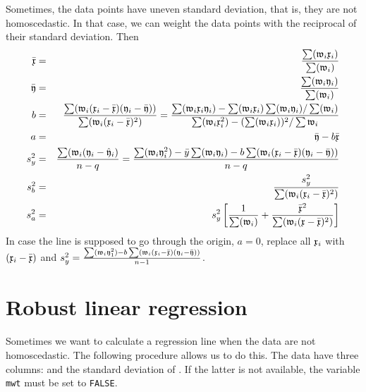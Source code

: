 \begin{refsection}
Sometimes, the data points have uneven standard deviation, that is, they are not homoscedastic. In that case, we can weight the data points with the reciprocal of their standard deviation. Then
\begin{eqnarray}
  \nonumber
  \bar{\mathfrak{x}} &=& \frac{\sum(\mathfrak{w}_i\mathfrak{x}_i)}{\sum(\mathfrak{w}_i)} \\
  \nonumber
  \bar{\mathfrak{y}} &=& \frac{\sum(\mathfrak{w}_i\mathfrak{y}_i)}{\sum(\mathfrak{w}_i)} \\
  \nonumber
  b &=& \frac{\sum(\mathfrak{w}_i (\mathfrak{x}_i-\bar{\mathfrak{x}}) (\mathfrak{y}_i-\bar{\mathfrak{y}}))}{\sum(\mathfrak{w}_i (\mathfrak{x}_i-\bar{\mathfrak{x}})^2)} = \frac{\sum(\mathfrak{w}_i\mathfrak{x}_i\mathfrak{y}_i) - \sum(\mathfrak{w}_i\mathfrak{x}_i) \sum(\mathfrak{w}_i\mathfrak{y}_i)/\sum(\mathfrak{w}_i)}{\sum(\mathfrak{w}_i\mathfrak{x}_i^2) - (\sum(\mathfrak{w}_i\mathfrak{x}_i))^2 / \sum\mathfrak{w}_i} \\
  \nonumber
  a &=& \bar{\mathfrak{y}} - b \bar{\mathfrak{x}} \\
  \nonumber
  s_y^2 &=& \frac{\sum(\mathfrak{w}_i (\mathfrak{y}_i - \hat{\mathfrak{y}}_i)}{n-q} = \frac{\sum(\mathfrak{w}_i\mathfrak{y}_i^2) - \bar{y}\sum(\mathfrak{w}_i\mathfrak{y}_i) - b \sum(\mathfrak{w}_i (\mathfrak{x}_i - \bar{\mathfrak{x}}) (\mathfrak{y}_i - \bar{\mathfrak{y}}))}{n-q} \\
  \nonumber
  s_b^2 &=& \frac{s_y^2}{\sum(\mathfrak{w}_i (\mathfrak{x}_i - \bar{\mathfrak{x}})^2)} \\
  s_a^2 &=& s_y^2 \left[\frac{1}{\sum(\mathfrak{w}_i)} + \frac{\bar{\mathfrak{x}}^2}{\sum(\mathfrak{w}_i (\mathfrak{x} - \bar{\mathfrak{x}})^2)} \right]
\end{eqnarray}
In case the line is supposed to go through the origin, \(a = 0 \), replace all \(\mathfrak{x}_i \) with \((\mathfrak{x}_i - \bar{\mathfrak{x}}) \) and \(s_y^2 = \frac{\sum(\mathfrak{w}_i\mathfrak{y}_1^2) - b \sum(\mathfrak{w}_i (\mathfrak{x}_i - \bar{\mathfrak{x}}) (\mathfrak{y}_i - \bar{\mathfrak{y}}))}{n-1} \).

\section{Robust linear regression}

Sometimes we want to calculate a regression line when the data are not homoscedastic. The following procedure \parencite[pp. 590-8]{Pre-89} allows us to do this. The data have three columns:  and the standard deviation of . If the latter is not available, the variable \texttt{mwt} must be set to \texttt{FALSE}.


\end{refsection}
